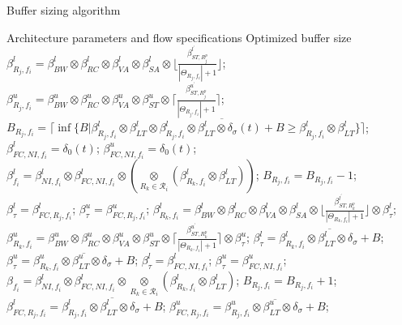 \documentclass[10pt,journal]{IEEEtran}
\begin{document}
\begin{algorithm}
\caption{Buffer sizing algorithm}
\label{alg:bufopt}
\begin{algorithmic}[1]
\Require Architecture parameters and flow specifications
\Ensure Optimized buffer size
            \State $\beta_{R_j,f_i}^l=\beta_{BW}^l\otimes\beta_{RC}^l\otimes\beta_{VA}^l\otimes\beta_{SA}^l\otimes\lfloor\frac{\beta_{ST,R_j^{p}}^{l^\prime}}{|\Theta_{R_j,f_i}|+1}\rfloor$;
            \State $\beta_{R_j,f_i}^u=\beta_{BW}^u\otimes\beta_{RC}^u\otimes\beta_{VA}^u\otimes\beta_{ST}^u\otimes\lceil\frac{\beta_{ST,R_j^{p}}^{u^\prime}}{|\Theta_{R_j,f_i}|+1}\rceil$;
            \State $B_{R_j,f_i}=\lceil\inf\{B|\beta_{R_j,f_i}^l\otimes\beta_{LT}^l\otimes\overline{\beta_{R_j,f_i}^l\otimes\beta_{LT}^l\otimes\delta_\sigma(t)+B}\geq\beta_{R_j,f_i}^l\otimes\beta_{LT}^l\}\rceil$;
        \EndFor
        \State $\beta_{FC,NI,f_i}^l=\delta_0(t)$; $\beta_{FC,NI,f_i}^u=\delta_0(t)$;
            \State $\beta_{f_i}^l=\beta_{NI,f_i}^l\otimes\beta_{FC,NI,f_i}^l\otimes(\underset{R_k\in\mathcal{R}_{i}}{\otimes}(\beta^l_{R_k,f_i}\otimes\beta^l_{LT}))$;
                \State $B_{R_j,f_i}=B_{R_j,f_i}-1$;
                \State $\beta_\tau^l=\beta_{FC,R_j,f_i}^l$; $\beta_\tau^u=\beta_{FC,R_j,f_i}^u$;
                    \State $\beta_{R_k,f_i}^l=\beta_{BW}^l\otimes\beta_{RC}^l\otimes\beta_{VA}^l\otimes\beta_{SA}^l\otimes\lfloor\frac{\beta_{ST,R_k^{p}}^{l^\prime}}{|\Theta_{R_k,f_i}|+1}\rfloor\otimes\beta_{\tau}^l$;
                    \State $\beta_{R_k,f_i}^u=\beta_{BW}^u\otimes\beta_{RC}^u\otimes\beta_{VA}^u\otimes\beta_{ST}^u\otimes\lceil\frac{\beta_{ST,R_k^{p}}^{u^\prime}}{|\Theta_{R_k,f_i}|+1}\rceil\otimes\beta_{\tau}^u$;
                    \State $\beta_{\tau}^l=\overline{\beta_{R_k,f_i}^l\otimes\beta_{LT}^l\otimes\delta_{\sigma}+B}$;
                    \State $\beta_{\tau}^u=\overline{\beta_{R_k,f_i}^u\otimes\beta_{LT}^u\otimes\delta_{\sigma}+B}$;
                \EndFor
                \State $\beta_\tau^l=\beta_{FC,NI,f_i}^l$; $\beta_\tau^u=\beta_{FC,NI,f_i}^u$;
                \State $\beta_{f_i}=\beta^l_{NI,f_i}\otimes\beta_{FC,NI,f_i}^l\otimes\underset{R_k\in\mathcal{R}_{i}}{\otimes}(\beta^l_{R_k,f_i}\otimes\beta^l_{LT})$;
            \EndWhile
                \State $B_{R_j,f_i}=B_{R_j,f_i}+1$;
                \State $\beta_{FC,R_j,f_i}^l=\overline{\beta_{R_j,f_i}^l\otimes\beta_{LT}^l\otimes\delta_{\sigma}+B}$;
                \State $\beta_{FC,R_j,f_i}^u=\overline{\beta_{R_j,f_i}^u\otimes\beta_{LT}^u\otimes\delta_{\sigma}+B}$;
            \EndIf
        \EndFor
    \EndFor
\end{algorithmic}
\end{algorithm}
\end{document}
